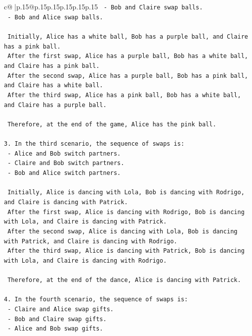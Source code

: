\documentclass{article}
\begin{document}
{\begin{supertabular}{c@{$\;$}|p{.15\linewidth}@{}p{.15\linewidth}p{.15\linewidth}p{.15\linewidth}p{.15\linewidth}p{.15\linewidth}}
{{{\texttt{   {-} Bob and Claire swap balls.} \\
\texttt{   {-} Bob and Alice swap balls.} \\
\\ 
\texttt{   Initially, Alice has a white ball, Bob has a purple ball, and Claire has a pink ball.} \\
\texttt{   After the first swap, Alice has a purple ball, Bob has a white ball, and Claire has a pink ball.} \\
\texttt{   After the second swap, Alice has a purple ball, Bob has a pink ball, and Claire has a white ball.} \\
\texttt{   After the third swap, Alice has a pink ball, Bob has a white ball, and Claire has a purple ball.} \\
\\ 
\texttt{   Therefore, at the end of the game, Alice has the pink ball.} \\
\\ 
\texttt{3. In the third scenario, the sequence of swaps is:} \\
\texttt{   {-} Alice and Bob switch partners.} \\
\texttt{   {-} Claire and Bob switch partners.} \\
\texttt{   {-} Bob and Alice switch partners.} \\
\\ 
\texttt{   Initially, Alice is dancing with Lola, Bob is dancing with Rodrigo, and Claire is dancing with Patrick.} \\
\texttt{   After the first swap, Alice is dancing with Rodrigo, Bob is dancing with Lola, and Claire is dancing with Patrick.} \\
\texttt{   After the second swap, Alice is dancing with Lola, Bob is dancing with Patrick, and Claire is dancing with Rodrigo.} \\
\texttt{   After the third swap, Alice is dancing with Patrick, Bob is dancing with Lola, and Claire is dancing with Rodrigo.} \\
\\ 
\texttt{   Therefore, at the end of the dance, Alice is dancing with Patrick.} \\
\\ 
\texttt{4. In the fourth scenario, the sequence of swaps is:} \\
\texttt{   {-} Claire and Alice swap gifts.} \\
\texttt{   {-} Bob and Claire swap gifts.} \\
\texttt{   {-} Alice and Bob swap gifts.} \\
}}}
\end{supertabular}}
\end{document}
